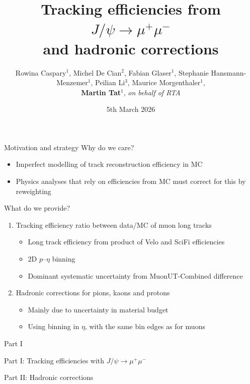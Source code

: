 \documentclass[xcolor={dvipsnames}]{beamer}
\title[A\&S week]{Tracking efficiencies from \texorpdfstring{$J/\psi\to\mu^+\mu^-$}{JpsiToMuMu} \\ and hadronic corrections}
\author[Martin Tat]{Rowina Caspary$^1$, Michel De Cian$^2$, Fabian Glaser$^1$, Stephanie Hansmann-Menzemer$^1$, Peilian Li$^3$, Maurice Morgenthaler$^1$, \\ \textbf{Martin Tat}$^1$, \textit{on behalf of RTA}}
\institute[Heidelberg]{Heidelberg University$^1$, University of Manchester$^2$, UCAS$^3$}
\date{5th March 2026}
\begin{document}
\begin{frame}
  \titlepage
\end{frame}


\begin{frame}{Motivation and strategy}
  \vspace{0.0cm}
  {\Large Why do we care?}
  \vspace{0.2cm}
  \begin{itemize}
    \setlength\itemsep{0.8em}
    \item{Imperfect modelling of track reconstruction efficiency in MC}
    \item{Physics analyses that rely on efficiencies from MC must correct for this by reweighting}
  \end{itemize}
  \vspace{0.3cm}
  {\Large What do we provide?}
  \vspace{0.2cm}
  \begin{enumerate}
    \item{Tracking efficiency ratio between data/MC of muon long tracks}
    \begin{itemize}
      \setlength\itemsep{0.2em}
      \item{Long track efficiency from product of Velo and SciFi efficiencies}
      \item{2D $p$--$\eta$ binning}
      \item{Dominant systematic uncertainty from MuonUT-Combined difference}
    \end{itemize}
    \item{Hadronic corrections for pions, kaons and protons}
    \begin{itemize}
      \setlength\itemsep{0.2em}
      \item{Mainly due to uncertainty in material budget}
      \item{Using binning in $\eta$, with the same bin edges as for muons}
    \end{itemize}
  \end{enumerate}
\end{frame}

\begin{frame}{Part I}
  \vspace{0.0cm}
  \begin{center}
    {\Large Part I: Tracking efficiencies with $J/\psi\to\mu^+\mu^-$}
  \end{center}
  \begin{center}
    {\Large Part II: Hadronic corrections}
  \end{center}
\end{frame}
\end{document}
